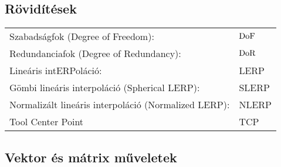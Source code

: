\subsection*{Rövidítések}

\begin{tabular}{ll}
	Szabadságfok (Degree of Freedom):& $\operatorname{DoF}$ \\
	Redundanciafok (Degree of Redundancy):& $\operatorname{DoR}$ \\
	Lineáris intERPoláció: & LERP \\
	Gömbi lineáris interpoláció (Spherical LERP): & SLERP \\
	Normalizált lineáris interpoláció (Normalized LERP): & NLERP \\
	Tool Center Point & TCP
\end{tabular}

\subsection*{Vektor és mátrix műveletek}


